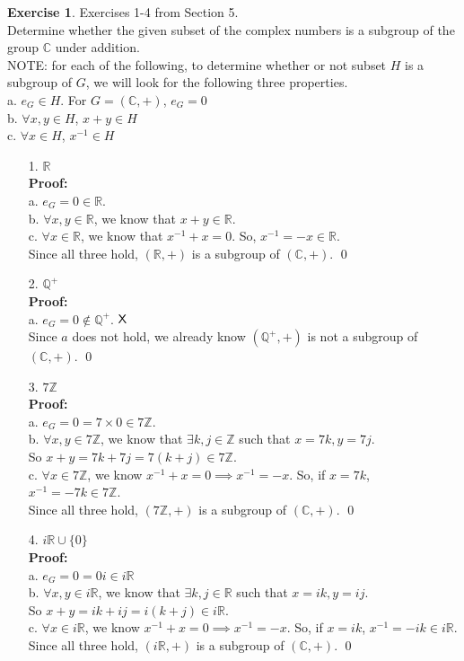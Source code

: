 \documentclass[12pt]{article}
\providecommand{\x}{\times}
\theoremstyle{definition}
\newtheorem{exercise}[theorem]{Exercise}
\newcommand{\Z}{\mathbb{Z}}
\newcommand{\Q}{\mathbb Q}
\newcommand{\R}{\mathbb R}
\newcommand{\V}{\vspace{0.3cm}\\}
\newcommand{\pro}{\V \textbf{Proof:} \V}
\begin{document}
\begin{exercise} Exercises 1-4 from Section 5.\\
Determine whether the given subset of the complex numbers is a subgroup of the group $\mathbb{C}$ under addition.\V
NOTE: for each of the following, to determine whether or not subset $H$ is a subgroup of $G$, we will look for the following three properties. \V
a. $e_G \in H$. For $G = (\mathbb{C}, +)$, $e_G = 0$\\
b. $\forall x,y \in H$, $x+y \in H$\\
c. $\forall x \in H$, $x^{-1} \in H$
\begin{enumerate}
\item[1.] $\R$ \pro
a. $e_G = 0 \in \R$. \checkmark \\
b. $\forall x,y \in \R$, we know that $x+y \in \R$. \checkmark \\ 
c. $\forall x \in \R$, we know that $x^{-1} + x = 0$. So, $x^{-1} = -x \in \R$. \checkmark \V
Since all three hold, $(\R,+)$ is a subgroup of $(\mathbb{C}, +)$. \qed

\item[2.] $\Q^+$ \pro
a. $e_G = 0 \not\in \Q^+$. $\text{\sffamily X}$\V
Since $a$ does not hold, we already know $(\Q^+, +)$ is not a subgroup of $(\mathbb{C}, +)$. \qed
\item[3.] $7\Z$ \pro
a. $e_G = 0 = 7 \x 0 \in 7\Z$. \checkmark \\
b. $\forall x,y \in 7\Z$, we know that $\exists k,j \in \Z$ such that $x= 7k, y=7j$.\\ So $x+y = 7k + 7j = 7(k+j) \in 7\Z$. \checkmark \\ 
c. $\forall x \in 7\Z$, we know $x^{-1} + x = 0 \implies x^{-1} = -x$. So, if $x = 7k$, $x^{-1} = -7k \in 7\Z$.  \checkmark \V
Since all three hold, $(7\Z,+)$ is a subgroup of $(\mathbb{C}, +)$. \qed
\item[4.] $i\R \cup \{0\}$ \pro
a. $e_G = 0 = 0i \in i\R$ \checkmark \\
b. $\forall x,y \in i\R$, we know that $\exists k,j\in \R$ such that $x=ik, y=ij$. \\ So $x+y = ik + ij = i(k+j) \in i\R$. \checkmark \\ 
c. $\forall x \in i\R$, we know $x^{-1} + x = 0 \implies x^{-1} = -x$. So, if $x = ik$, $x^{-1} = -ik \in i\R$.  \checkmark \V
Since all three hold, $(i\R,+)$ is a subgroup of $(\mathbb{C}, +)$. \qed
\end{enumerate}
\end{exercise}
\end{document}
